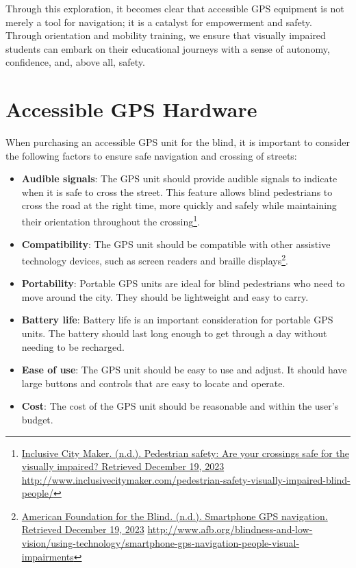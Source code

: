 \documentclass[12pt,letterpaper,twoside]{extreport}
\begin{document}
Through this exploration, it becomes clear that accessible GPS equipment is not merely a tool for navigation; it is a catalyst for empowerment and safety. Through orientation and mobility training, we ensure that visually impaired students can embark on their educational journeys with a sense of autonomy, confidence, and, above all, safety.


\pagebreak \hypertarget{accessible-gps-mapping-hardware}{}\section{Accessible GPS Hardware}\label{accessible-gps-mapping-hardware}
When purchasing an accessible GPS unit for the blind, it is important to consider the following factors to ensure safe navigation and crossing of streets:
\begin{itemize}[leftmargin=*]
\item \textbf{Audible signals}: The GPS unit should provide audible signals to indicate when it is safe to cross the street. This feature allows blind pedestrians to cross the road at the right time, more quickly and safely while maintaining their orientation throughout the crossing\footnote{\raggedright \href{http://www.inclusivecitymaker.com/pedestrian-safety-visually-impaired-blind-people/}{Inclusive City Maker. (n.d.). Pedestrian safety: Are your crossings safe for the visually impaired? Retrieved December 19, 2023} \url{http://www.inclusivecitymaker.com/pedestrian-safety-visually-impaired-blind-people/}}.
\item \textbf{Compatibility}: The GPS unit should be compatible with other assistive technology devices, such as screen readers and braille displays\footnote{\raggedright \href{http://www.afb.org/blindness-and-low-vision/using-technology/smartphone-gps-navigation-people-visual-impairments}{American Foundation for the Blind. (n.d.). Smartphone GPS navigation. Retrieved December 19, 2023} \url{http://www.afb.org/blindness-and-low-vision/using-technology/smartphone-gps-navigation-people-visual-impairments}}.
\item \textbf{Portability}: Portable GPS units are ideal for blind pedestrians who need to move around the city. They should be lightweight and easy to carry.
\item \textbf{Battery life}: Battery life is an important consideration for portable GPS units. The battery should last long enough to get through a day without needing to be recharged.
\item \textbf{Ease of use}: The GPS unit should be easy to use and adjust. It should have large buttons and controls that are easy to locate and operate.
\item \textbf{Cost}: The cost of the GPS unit should be reasonable and within the user’s budget.
\end{itemize}
\end{document}
